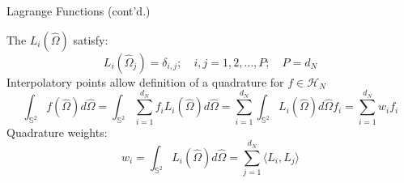 \documentclass[xcolor=x11names,compress]{beamer}
\renewcommand{\(}{\begin{columns}}
\renewcommand{\)}{\end{columns}}
\newcommand{\<}[1]{\begin{column}{#1}}
\renewcommand{\>}{\end{column}}
\newcommand{\vOmega}{\ensuremath{\hat{\Omega}}}
\newcommand{\hn}{\mathcal{H}_N}
\newcommand{\maths}{\mathbb{S}^2}
\newcommand{\dn}{d_N}
\newcommand{\lij}{\langle L_i,L_j \rangle}
\begin{document}


\begin{frame}{Lagrange Functions (cont'd.)}

The $L_{i}(\vOmega)$ satisfy:
\begin{equation}
L_i(\vOmega_j) = \delta_{i,j};\quad i,j = 1,2,\ldots,P;\quad P = \dn
\end{equation}
\pause
Interpolatory points allow definition of a quadrature for $f \in \hn$%
\begin{equation}
\int_{\maths}f(\vOmega)d\vOmega = \int_{\maths}\sum_{i=1}^{\dn} f_i L_i(\vOmega)d\vOmega 
= \sum_{i=1}^{\dn}\int_{\maths}L_i(\vOmega)d\vOmega f_i = \sum_{i=1}^{\dn} w_i f_i
\end{equation}
\pause
Quadrature weights:
\begin{equation}
w_i = \int_{\maths}L_{i}(\vOmega)d\vOmega = \sum_{j=1}^{\dn}\lij
\end{equation}
\end{frame}
\end{document}
